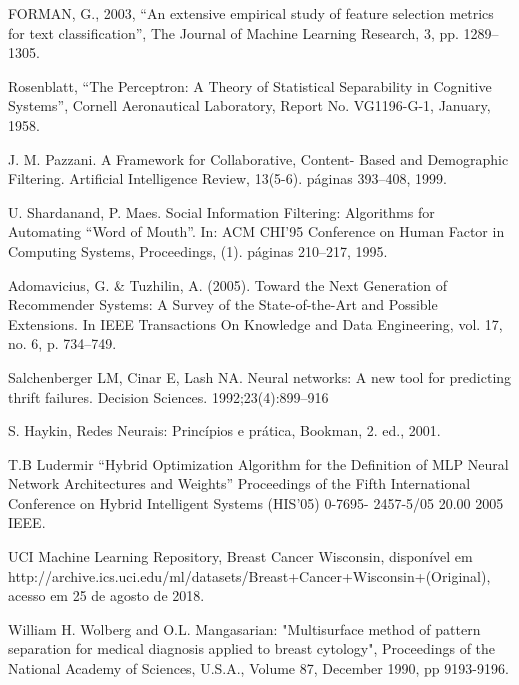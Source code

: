 \documentclass[conference]{IEEEtran}
\begin{document}
\begin{thebibliography}{00}
FORMAN, G., 2003, “An extensive empirical study of feature selection metrics for
text classification”, The Journal of Machine Learning Research, 3, pp. 1289–
1305.

 Rosenblatt, “The Perceptron: A Theory of Statistical Separability in Cognitive Systems”, Cornell Aeronautical Laboratory, Report No. VG1196-G-1, January, 1958. 

 J. M. Pazzani. A Framework for Collaborative, Content- Based and Demographic Filtering. Artificial Intelligence Review, 13(5-6). páginas 393–408, 1999.

 U. Shardanand, P. Maes. Social Information Filtering: Algorithms for Automating “Word of Mouth”. In: ACM CHI’95 Conference on Human Factor in Computing Systems, Proceedings, (1). páginas 210–217, 1995.

 Adomavicius, G. & Tuzhilin, A. (2005). Toward the Next Generation of Recommender
Systems: A Survey of the State-of-the-Art and Possible Extensions. In IEEE
Transactions On Knowledge and Data Engineering, vol. 17, no. 6, p. 734–749.


 Salchenberger LM, Cinar E, Lash NA. Neural networks: A new tool for predicting thrift failures. Decision Sciences. 1992;23(4):899–916

 S. Haykin, Redes Neurais: Princípios e prática, Bookman, 2. ed., 2001.

 T.B Ludermir “Hybrid Optimization Algorithm for the Definition of MLP Neural Network Architectures and Weights” Proceedings of the Fifth International Conference on Hybrid Intelligent Systems (HIS’05) 0-7695- 2457-5/05 20.00 2005 IEEE.

 UCI Machine Learning Repository, Breast Cancer Wisconsin, disponível em http://archive.ics.uci.edu/ml/datasets/Breast+Cancer+Wisconsin+(Original), acesso em 25 de agosto de 2018.

 William H. Wolberg and O.L. Mangasarian: "Multisurface method of pattern separation for medical diagnosis applied to breast cytology", Proceedings of the National Academy of Sciences, U.S.A., Volume 87, December 1990, pp 9193-9196.




\end{thebibliography}
\end{document}
